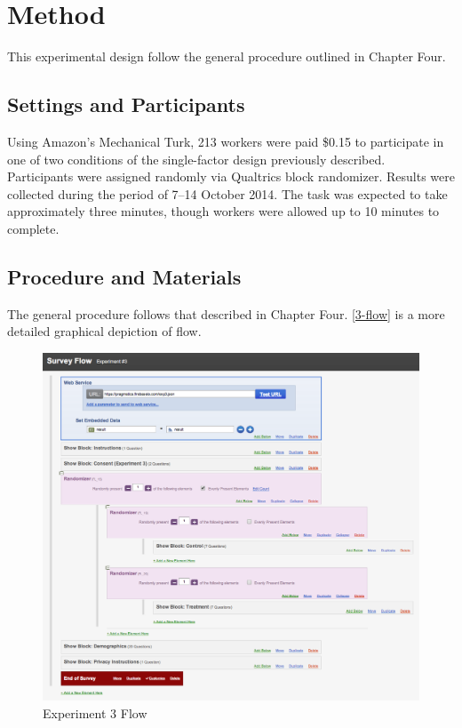 \section{Method}
\label{method}

This experimental design follow the general procedure outlined in Chapter Four.

\subsection{Settings and Participants}
\label{settingsandparticipants}

Using Amazon's Mechanical Turk, 213 workers were paid \$0.15 to participate in one of two conditions of the single-factor design previously described. Participants were assigned randomly via Qualtrics block randomizer. Results were collected during the period of 7--14 October 2014. The task was expected to take approximately three minutes, though workers were allowed up to 10 minutes to complete.

\subsection{Procedure and Materials}
\label{procedureandmaterials}

The general procedure follows that described in Chapter Four.  \autoref{3-flow}  is a more detailed graphical depiction of flow.

\begin{figure}
\centerline{
  \includegraphics[scale=.3]{chapter7.tex/exp3-flow}
  }
\caption{Experiment 3 Flow}
\label{3-flow}
\end{figure}

